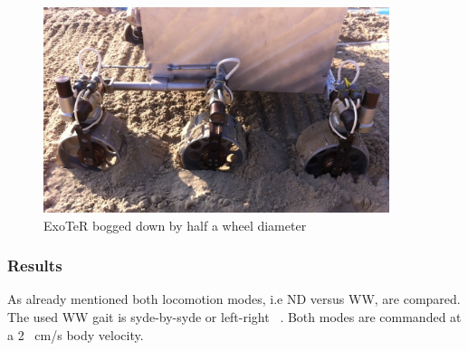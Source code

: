 \documentclass[a4paper,twocolumn]{esapub2005} %
\begin{document}
\begin{figure}[h!]
    \centering
    \includegraphics[width=0.9\textwidth]{volleyexoterdigg.jpg}
    \caption{ExoTeR bogged down by half a wheel diameter}
    \label{fig:volleyexoterdigg}
\end{figure}

\subsubsection{Results} As already mentioned both locomotion modes, i.e ND
versus WW, are compared. The used WW gait is syde-by-syde or left-right
~\cite{LucWalkingGaits}. Both modes are commanded at a 2 ~\unit{cm/s} body velocity.
\end{document}
